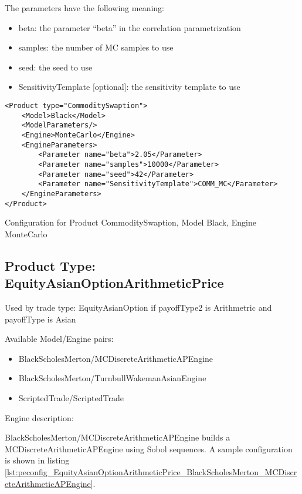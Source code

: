 The parameters have the following meaning:

\begin{itemize}
\item beta: the parameter ``beta'' in the correlation parametrization
\item samples: the number of MC samples to use
\item seed: the seed to use
\item SensitivityTemplate [optional]: the sensitivity template to use 
\end{itemize}

\begin{longlisting}
\begin{verbatim}
<Product type="CommoditySwaption">
    <Model>Black</Model>
    <ModelParameters/>
    <Engine>MonteCarlo</Engine>
    <EngineParameters>
        <Parameter name="beta">2.05</Parameter>
        <Parameter name="samples">10000</Parameter>
        <Parameter name="seed">42</Parameter>    
        <Parameter name="SensitivityTemplate">COMM_MC</Parameter>
    </EngineParameters>
</Product>
\end{verbatim}
\caption{Configuration for Product CommoditySwaption, Model Black, Engine MonteCarlo}
\label{lst:peconfig_CommoditySwaption_Black_MonteCarlo}
\end{longlisting}
    
\subsection{Product Type: EquityAsianOptionArithmeticPrice}

Used by trade type: EquityAsianOption if payoffType2 is Arithmetric and payoffType is Asian

Available Model/Engine pairs:

\begin{itemize}
  \item BlackScholesMerton/MCDiscreteArithmeticAPEngine
  \item BlackScholesMerton/TurnbullWakemanAsianEngine
  \item ScriptedTrade/ScriptedTrade
\end{itemize}

Engine description:

BlackScholesMerton/MCDiscreteArithmeticAPEngine builds a MCDiscreteArithmeticAPEngine using Sobol sequences. A sample
configuration is shown in listing
\ref{lst:peconfig_EquityAsianOptionArithmeticPrice_BlackScholesMerton_MCDiscreteArithmeticAPEngine}.

